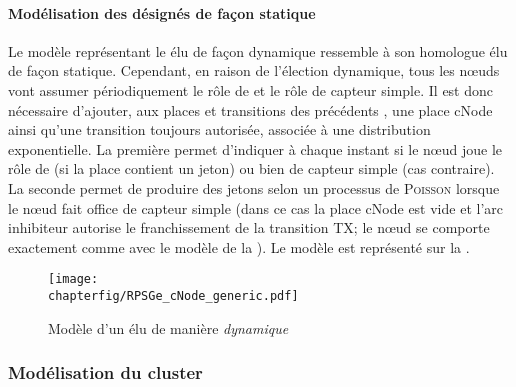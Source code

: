             \paragraph{Modélisation des \cns désignés de façon statique}
Le modèle \rpsge représentant le \cn élu de façon dynamique ressemble à son homologue élu de façon statique.
Cependant, en raison de l'élection dynamique, tous les nœuds vont assumer périodiquement le rôle de \cn et le rôle de capteur simple.
Il est donc nécessaire d'ajouter, aux places et transitions des précédents \cns, une place \textsf{cNode} ainsi qu'une transition toujours autorisée, associée à une distribution exponentielle.
La première permet d'indiquer à chaque instant si le nœud joue le rôle de \cn (si la place contient un jeton) ou bien de capteur simple (cas contraire).
La seconde permet de produire des jetons selon un processus de \textsc{Poisson} lorsque le nœud fait office de capteur simple (dans ce cas la place \textsf{cNode} est vide et l'arc inhibiteur autorise le franchissement de la transition \textsf{TX}; le nœud se comporte exactement comme avec le modèle de la ).
Le modèle est représenté sur la .
\begin{figure}[!ht]
    \centering
    \texttt{[image: \\chapterfig/RPSGe\_cNode\_generic.pdf]}
    \caption{Modèle \rpsge d'un \cn élu de manière \emph{dynamique}}\label{sa:fig:cnodegspn2}
\end{figure}

        \subsubsection{Modélisation du cluster}

